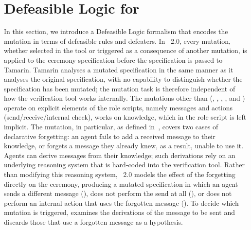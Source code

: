 \section{Defeasible Logic for \forget{}}
\label{Sec:DefeasibleLogic}

In this section, we introduce a Defeasible Logic formalism that encodes the \forget{} mutation in terms of defeasible rules and defeaters. In \XMen~2.0, every mutation, whether selected in the tool or triggered as a consequence of another mutation, is applied to the ceremony specification before the specification is passed to Tamarin. Tamarin analyses a mutated specification in the same manner as it analyses the original specification, with no capability to distinguish whether the specification has been mutated; the mutation task is therefore independent of how the verification tool works internally. The mutations other than \forget{} (\skipmutation{}, \add{}, \replace{}, \neglect{}, and \disorder{}) operate on explicit elements of the role scripts, namely messages and actions (send/receive/internal check), \forget{} works on knowledge, which in the role script is left implicit. The \forget{} mutation, in particular, as defined in~, covers two cases of declarative forgetting: an agent fails to add a received message to their knowledge, or forgets a message they already knew, as a result, unable to use it. Agents can derive messages from their knowledge; such derivations rely on an underlying reasoning system that is hard-coded into the verification tool. Rather than modifying this reasoning system, \XMen~2.0  models the effect of the forgetting directly on the ceremony, producing a mutated specification in which an agent sends a different message (\replace{}), does not perform the send at all (\skipmutation{}), or does not perform an internal action that uses the forgotten message (\neglect{}). To decide which mutation is triggered,  examines the derivations of the message to be sent and discards those that use a forgotten message as a hypothesis.

